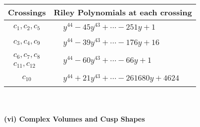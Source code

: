 \documentclass[1p]{elsarticle_modified}
\theoremstyle{definition}
\begin{document}
\begin{tabular}{m{50pt}|m{274pt}}
Crossings & \hspace{64pt}Riley Polynomials at each crossing \\
\hline $$\begin{aligned}c_{1},c_{2},c_{5}\end{aligned}$$&$\begin{aligned}
&y^{44}-45 y^{43}+\cdots-251 y+1
\end{aligned}$\\
\hline $$\begin{aligned}c_{3},c_{4},c_{9}\end{aligned}$$&$\begin{aligned}
&y^{44}-39 y^{43}+\cdots-176 y+16
\end{aligned}$\\
\hline $$\begin{aligned}c_{6},c_{7},c_{8}\\c_{11},c_{12}\end{aligned}$$&$\begin{aligned}
&y^{44}-60 y^{43}+\cdots-66 y+1
\end{aligned}$\\
\hline $$\begin{aligned}c_{10}\end{aligned}$$&$\begin{aligned}
&y^{44}+21 y^{43}+\cdots-261680 y+4624
\end{aligned}$\\
\hline
\end{tabular}\\~\\
\newpage\flushleft \textbf{(vi) Complex Volumes and Cusp Shapes}
\end{document}
